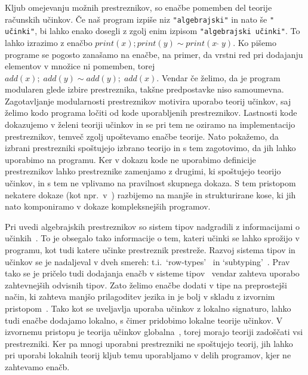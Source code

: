 \documentclass{article}
\begin{document}
Kljub omejevanju možnih prestreznikov, so enačbe pomemben del teorije računskih učinkov. Če naš program izpiše niz \texttt{"algebrajski"} in nato še \texttt{" učinki"}, bi lahko enako dosegli z zgolj enim izpisom \texttt{"algebrajski učinki"}. To lahko izrazimo z enačbo $print(x); print(y) \sim print(x\;\hat{}\;y)$. Ko pišemo programe se pogosto zanašamo na enačbe, na primer, da vrstni red pri dodajanju elementov v množice ni pomemben, torej $add(x);\; add(y) \sim add(y);\; add(x)$. Vendar če želimo, da je program modularen glede izbire prestreznika, takšne predpostavke niso samoumevna. Zagotavljanje modularnosti prestreznikov motivira uporabo teorij učinkov, saj želimo kodo programa ločiti od kode uporabljenih prestreznikov. Lastnosti kode dokazujemo v želeni teoriji učinkov in se pri tem ne oziramo na implementacijo prestreznikov, temveč zgolj upoštevamo enačbe teorije. Nato pokažemo, da izbrani prestrezniki spoštujejo izbrano teorijo in s tem zagotovimo, da jih lahko uporabimo na programu. Ker v dokazu kode ne uporabimo definicije prestreznikov lahko prestreznike zamenjamo z drugimi, ki spoštujejo teorijo učinkov, in s tem ne vplivamo na pravilnost skupnega dokaza. S tem pristopom nekatere dokaze (kot npr.\ v~\cite{DBLP:journals/jlp/BauerP15}) razbijemo na manjše in strukturirane kose, ki jih nato komponiramo v dokaze kompleksnejših programov.

Pri uvedi algebrajskih prestreznikov so sistem tipov nadgradili z informacijami o učinkih~\cite{DBLP:conf/esop/PlotkinP09}. To je obsegalo tako informacije o tem, kateri učinki se lahko sprožijo v programu, kot tudi katere učinke prestreznik prestreže. Razvoj sistema tipov in učinkov se je nadaljeval v dveh smereh: t.i.\ `row-types'~\cite{DBLP:conf/icfp/HillerstromL16} in `subtyping'~\cite{DBLP:conf/esop/SalehKPS18}. Prav tako se je pričelo tudi dodajanja enačb v sisteme tipov~\cite{DBLP:journals/pacmpl/Ahman18} vendar zahteva uporabo zahtevnejših odvisnih tipov. Zato želimo enačbe dodati v tipe na preprostejši način, ki zahteva manjšo prilagoditev jezika in je bolj v skladu z izvornim pristopom~\cite{DBLP:conf/esop/PlotkinP09}. Tako kot se uveljavlja uporaba učinkov z lokalno signaturo, lahko tudi enačbe dodajamo lokalno, s čimer pridobimo lokalne teorije učinkov. V izvornemu pristopu je teorija učinkov globalna~\cite{DBLP:conf/esop/PlotkinP09}, torej morajo teoriji zadoščati vsi prestrezniki. Ker pa mnogi uporabni prestrezniki ne spoštujejo teorij, jih lahko pri uporabi lokalnih teorij kljub temu uporabljamo v delih programov, kjer ne zahtevamo enačb.
\end{document}
